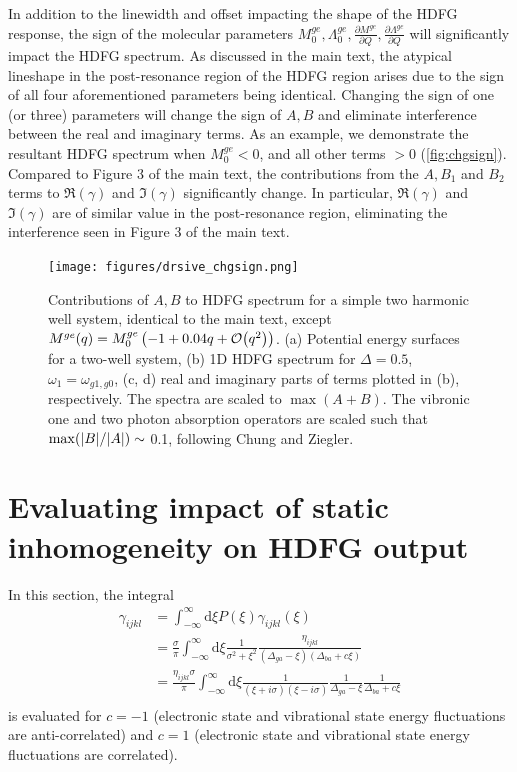 \documentclass[aip, jcp, reprint, onecolumn, nofootinbib]{revtex4-2}
\begin{document}
In addition to the linewidth and offset impacting the shape of the HDFG response, the sign of the molecular parameters $M^{ge}_0, \Lambda^{ge}_0, \frac{\partial M^{ge}}{\partial Q} , \frac{\partial \Lambda^{ge}}{\partial Q}$ will significantly impact the HDFG spectrum.
As discussed in the main text, the atypical lineshape in the post-resonance region of the HDFG region arises due to the sign of all four aforementioned parameters being identical.
Changing the sign of one (or three) parameters will change the sign of $A, B$ and eliminate interference between the real and imaginary terms.  
As an example, we demonstrate the resultant HDFG spectrum when $M_0^{ge} < 0$, and all other terms $>0$ (\autoref{fig:chgsign}).
Compared to Figure 3 of the main text, the contributions from the $A, B_1$ and $B_2$ terms to $\Re(\gamma)$ and $\Im(\gamma)$ significantly change.
In particular, $\Re(\gamma)$ and $\Im(\gamma)$ are of similar value in the post-resonance region, eliminating the interference seen in Figure 3 of the main text.
\newpage
\begin{figure}[!htbp]
	\centering
	\texttt{[image: figures/drsive\_chgsign.png]}
	\caption{Contributions of $A, B$ to HDFG spectrum for a simple two harmonic well system, identical to the main text, except $M^{ge}(q) = M^{ge}_0 \left(-1 + 0.04 q + \order{q^2}\right)$.
		(a) Potential energy surfaces for a two-well system, (b) 1D HDFG spectrum for $\Delta = 0.5$, $\omega_1 = \omega_{g1, g0}$, (c, d) real and imaginary parts of terms plotted in (b), respectively.
		The spectra are scaled to $\max{(A+B)}$. 
		The vibronic one and two photon absorption operators are scaled such that $\max(\abs{B}/\abs{A}) \sim$ 0.1, following Chung and Ziegler. \cite{Ziegler1988}
} 
	\label{fig:chgsign}
\end{figure}
\pagebreak
\section{Evaluating impact of static inhomogeneity on HDFG output}
In this section, the integral
\begin{equation}\label{generalcontour}
	\begin{split}
		\gamma_{ijkl} &= \int_{-\infty}^\infty \mathrm{d}\xi P(\xi) \gamma_{ijkl}(\xi)\\
		&= \frac{\sigma}{\pi}\int_{-\infty}^\infty \mathrm{d}\xi \frac{1}{\sigma^2 + \xi^2} \frac{\eta_{ijkl}}{\left(\Delta_{ga} - \xi\right)\left(\Delta_{ba}+ c\xi\right)} \\
		&= \frac{\eta_{ijkl} \sigma}{\pi} \int_{-\infty}^\infty \mathrm{d}\xi\frac{1}{(\xi + i\sigma)(\xi - i\sigma)} \frac{1}{\Delta_{ga} - \xi} \frac{1}{\Delta_{ba} + c\xi}\\
	\end{split}
\end{equation}
is evaluated for $c=-1$ (electronic state and vibrational state energy fluctuations are anti-correlated) and $c=1$ (electronic state and vibrational state energy fluctuations are correlated).
\end{document}
